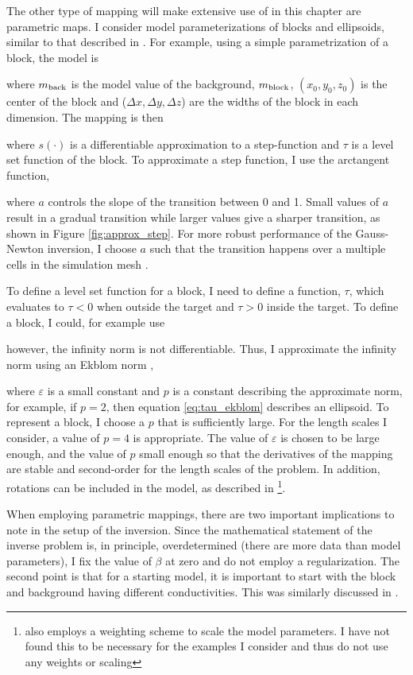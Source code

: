 The other type of mapping will make extensive use of in this chapter are parametric maps. I consider model parameterizations of blocks and ellipsoids, similar to that described in \cite{McMillan2015a, Mcmillan2017}. For example, using a simple parametrization of a block, the model is

where $m_{\rm back}$ is the model value of the background, $m_{\rm block}$, $(x_0, y_0, z_0)$ is the center of the block and ($\Delta x, \Delta y, \Delta z$) are the widths of the block in each dimension. The mapping is then

where $s(\cdot)$ is a differentiable approximation to a step-function and $\tau$ is a level set function of the block. To approximate a step function, I use the arctangent function,

where $a$ controls the slope of the transition between 0 and 1. Small values of $a$ result in a gradual transition while larger values give a sharper transition, as shown in Figure \ref{fig:approx_step}. For more robust performance of the Gauss-Newton inversion, I choose $a$ such that the transition happens over a multiple cells in the simulation mesh \citep{Mcmillan2017}.




To define a level set function for a block, I need to define a function, $\tau$, which evaluates to $\tau < 0$ when outside the target and $\tau > 0$ inside the target. To define a block, I could, for example use

however, the infinity norm is not differentiable. Thus, I approximate the infinity norm using an Ekblom norm \citep{Ekblom1973},

where $\varepsilon$ is a small constant and $p$ is a constant describing the approximate norm, for example, if $p=2$, then equation \ref{eq:tau_ekblom} describes an ellipsoid. To represent a block, I choose a $p$ that is sufficiently large. For the length scales I consider, a value of $p=4$ is appropriate. The value of $\varepsilon$ is chosen to be large enough, and the value of $p$ small enough so that the derivatives of the mapping are stable and second-order for the length scales of the problem. In addition, rotations can be included in the model, as described in \cite{Mcmillan2017} \footnote{\cite{Mcmillan2017} also employs a weighting scheme to scale the model parameters. I have not found this to be necessary for the examples I consider and thus do not use any weights or scaling}.

When employing parametric mappings, there are two important implications to note in the setup of the inversion. Since the mathematical statement of the inverse problem is, in principle, overdetermined (there are more data than model parameters), I fix the value of $\beta$ at zero and do not employ a regularization. The second point is that for a starting model, it is important to start with the block and background having different conductivities. This was similarly discussed in \cite{Mcmillan2017}.


